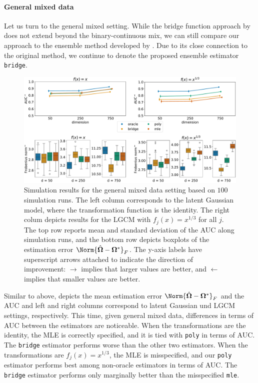 \paragraph{General mixed data}
Let us turn to the general mixed setting. While the bridge function approach by \citet{Fan17} does not extend beyond the binary-continuous mix, we can still compare our approach to the ensemble method developed by \citet{Feng19}. Due to its close connection to the original method, we continue to denote the proposed ensemble estimator \texttt{bridge}.
\begin{figure}
    \centering
    \includegraphics[width=\textwidth]{Figures/simulation_results_general.pdf}
    \caption{Simulation results for the general mixed data setting based on \(100\) simulation runs. The left column corresponds to the latent Gaussian model, where the transformation function is the identity. The right colum depicts results for the LGCM with \(f_j(x) = x^{1/3}\) for all \(j\). The top row reports mean and standard deviation of the AUC along simulation runs, and the bottom row depicts boxplots of the estimation error $\Norm{\hat{\mathbf\Omega} - \mathbf\Omega^*}_F$. The y-axis labels have superscript arrows attached to indicate the direction of improvement: \(\rightarrow\) implies that larger values are better, and \(\leftarrow\) implies that smaller values are better.}
    \label{fig:bench_genral}
\end{figure}

Similar to above,  depicts the mean estimation error $\Norm{\hat{\mathbf\Omega} - \mathbf\Omega^*}_F$ and the AUC and left and right columns correspond to latent Gaussian und LGCM settings, respectively. This time, given general mixed data, differences in terms of AUC between the estimators are noticeable. When the transformations are the identity, the MLE is correctly specified, and it is tied with \texttt{poly} in terms of AUC. The \texttt{bridge} estimator performs worse than the other two estimators. When the transformations are $f_j(x) = x^{1/3}$, the MLE is misspecified, and our \texttt{poly} estimator performs best among non-oracle estimators in terms of AUC. The \texttt{bridge} estimator performs only marginally better than the misspecified \texttt{mle}.

